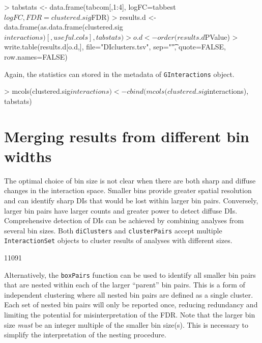 \documentclass[12pt]{report}
\renewenvironment{Schunk}{\vspace{0pt}}{\vspace{0pt}}
\newcommand{\code}[1]{{\small\texttt{#1}}}
\begin{document}
\begin{Schunk}
\begin{Sinput}
> tabstats <- data.frame(tabcom[,1:4], logFC=tabbest$logFC, FDR=clustered.sig$FDR)
> results.d <- data.frame(as.data.frame(clustered.sig$interactions)[,useful.cols], tabstats)
> o.d <- order(results.d$PValue)
> write.table(results.d[o.d,], file="DIclusters.tsv", sep="\t", quote=FALSE, row.names=FALSE)
\end{Sinput}
\end{Schunk}

Again, the statistics can stored in the metadata of \code{GInteractions} object.

\begin{Schunk}
\begin{Sinput}
> mcols(clustered.sig$interactions) <- cbind(mcols(clustered.sig$interactions), tabstats)
\end{Sinput}
\end{Schunk}

\section{Merging results from different bin widths}
\label{sec:mergebins}
The optimal choice of bin size is not clear when there are both sharp and diffuse changes in the interaction space.
Smaller bins provide greater spatial resolution and can identify sharp DIs that would be lost within larger bin pairs.
Conversely, larger bin pairs have larger counts and greater power to detect diffuse DIs.
Comprehensive detection of DIs can be achieved by combining analyses from several bin sizes.
Both \code{diClusters} and \code{clusterPairs} accept multiple \code{InteractionSet} objects to cluster results of analyses with different sizes.

\begin{Schunk}
\begin{Soutput}
[1] 11091
\end{Soutput}
\end{Schunk}

Alternatively, the \code{boxPairs} function can be used to identify all smaller bin pairs that are nested within each of the larger ``parent'' bin pairs.
This is a form of independent clustering where all nested bin pairs are defined as a single cluster.
Each set of nested bin pairs will only be reported once, reducing redundancy and limiting the potential for misinterpretation of the FDR.
Note that the larger bin size \textit{must} be an integer multiple of the smaller bin size(s).
This is necessary to simplify the interpretation of the nesting procedure.
\end{document}
